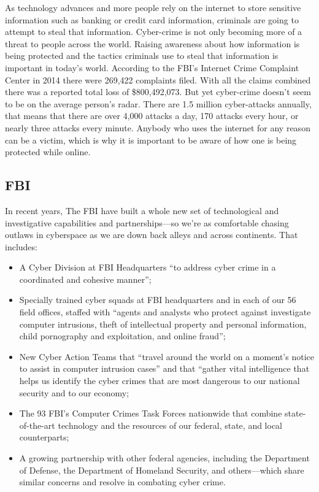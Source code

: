 \documentclass[12pt]{article}
\begin{document}
As technology advances and more people rely on the internet to store sensitive information such as banking or credit card information, criminals are going to attempt to steal that information. Cyber-crime is not only becoming more of a threat to people across the world. Raising awareness about how information is being protected and the tactics criminals use to steal that information is important in today's world. According to the FBI's Internet Crime Complaint Center in 2014 there were 269,422 complaints filed. With all the claims combined there was a reported total loss of \$800,492,073. But yet cyber-crime doesn't seem to be on the average person's radar. There are 1.5 million cyber-attacks annually, that means that there are over 4,000 attacks a day, 170 attacks every hour, or nearly three attacks every minute. Anybody who uses the internet for any reason can be a victim, which is why it is important to be aware of how one is being protected while online.

\subsection{FBI}
In recent years, The FBI have built a whole new set of technological and investigative capabilities and partnerships—so we’re as comfortable chasing outlaws in cyberspace as we are down back alleys and across continents. That includes:

\begin{itemize}
    \item A Cyber Division at FBI Headquarters “to address cyber crime in a coordinated and cohesive manner”;
    \item Specially trained cyber squads at FBI headquarters and in each of our 56 field offices, staffed with “agents and analysts who protect against investigate computer intrusions, theft of intellectual property and personal information, child pornography and exploitation, and online fraud”;
    \item New Cyber Action Teams that “travel around the world on a moment’s notice to assist in computer intrusion cases” and that “gather vital intelligence that helps us identify the cyber crimes that are most dangerous to our national security and to our economy;
    \item The 93 FBI's Computer Crimes Task Forces nationwide that combine state-of-the-art technology and the resources of our federal, state, and local counterparts;
    \item A growing partnership with other federal agencies, including the Department of Defense, the Department of Homeland Security, and others—which share similar concerns and resolve in combating cyber crime.
\end{itemize}
\end{document}
